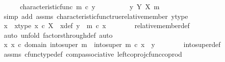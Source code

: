 \begin{isabellebody}
\ \ \ \ \isamarkupfalse%
\ {\isachardoublequoteopen}characteristic{\isacharunderscore}{\kern0pt}func\ m\ {\isasymcirc}\isactrlsub c\ y\ {\isacharequal}{\kern0pt}\ {\isasymt}{\isachardoublequoteclose}\isanewline
\ \ \ \ \isamarkupfalse%
\ \isamarkupfalse%
\ {\isachardoublequoteopen}y\ {\isasymin}\isactrlbsub Y\isactrlesub \ {\isacharparenleft}{\kern0pt}X{\isacharcomma}{\kern0pt}\ m{\isacharparenright}{\kern0pt}{\isachardoublequoteclose}\isanewline
\ \ \ \ \ \ \isamarkupfalse%
\ {\isacharparenleft}{\kern0pt}simp\ add{\isacharcolon}{\kern0pt}\ assms\ characteristic{\isacharunderscore}{\kern0pt}func{\isacharunderscore}{\kern0pt}true{\isacharunderscore}{\kern0pt}relative{\isacharunderscore}{\kern0pt}member\ y{\isacharunderscore}{\kern0pt}type{\isacharparenright}{\kern0pt}\isanewline
\ \ \ \ \isamarkupfalse%
\ \isamarkupfalse%
\ x\ \ x{\isacharunderscore}{\kern0pt}type{\isacharcolon}{\kern0pt}\ {\isachardoublequoteopen}x\ {\isasymin}\isactrlsub c\ X{\isachardoublequoteclose}\ \ x{\isacharunderscore}{\kern0pt}def{\isacharcolon}{\kern0pt}\ {\isachardoublequoteopen}y\ {\isacharequal}{\kern0pt}\ m\ {\isasymcirc}\isactrlsub c\ x{\isachardoublequoteclose}\isanewline
\ \ \ \ \ \ \isamarkupfalse%
\ relative{\isacharunderscore}{\kern0pt}member{\isacharunderscore}{\kern0pt}def{}\ \isamarkupfalse%
\ {\isacharparenleft}{\kern0pt}auto{\isacharcomma}{\kern0pt}\ unfold\ factors{\isacharunderscore}{\kern0pt}through{\isacharunderscore}{\kern0pt}def{}{\isacharcomma}{\kern0pt}\ auto{\isacharparenright}{\kern0pt}\isanewline
\ \ \ \ \isamarkupfalse%
\ \isamarkupfalse%
\ {\isachardoublequoteopen}{\isasymexists}x{\isachardot}{\kern0pt}\ x\ {\isasymin}\isactrlsub c\ domain\ {\isacharparenleft}{\kern0pt}into{\isacharunderscore}{\kern0pt}super\ m{\isacharparenright}{\kern0pt}\ {\isasymand}\ into{\isacharunderscore}{\kern0pt}super\ m\ {\isasymcirc}\isactrlsub c\ x\ {\isacharequal}{\kern0pt}\ y{\isachardoublequoteclose}\isanewline
\ \ \ \ \ \ \isamarkupfalse%
\ into{\isacharunderscore}{\kern0pt}super{\isacharunderscore}{\kern0pt}def\ \isamarkupfalse%
\ assms\ cfunc{\isacharunderscore}{\kern0pt}type{\isacharunderscore}{\kern0pt}def\ comp{\isacharunderscore}{\kern0pt}associative\ left{\isacharunderscore}{\kern0pt}coproj{\isacharunderscore}{\kern0pt}cfunc{\isacharunderscore}{\kern0pt}coprod\isanewline
\ \ \ \ \ \ \isamarkupfalse%

\end{isabellebody}
